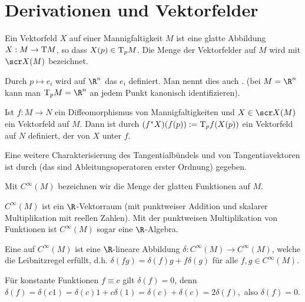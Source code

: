 

\section{Derivationen und Vektorfelder}


\begin{df} \label{3.7}
    Ein Vektorfeld $X$ auf einer Mannigfaltigkeit $M$ ist eine glatte Abbildung $X: M \to \mathrm{T} M$, so dass $X(p) \in \mathrm{T}_p M$.
    Die Menge der Vektorfelder auf $M$ wird mit $\scr X(M)$ bezeichnet.
\end{df}

\begin{ex}
    Durch $p \mapsto e_i$ wird auf $\R^n$ das  $e_i$ definiert.
    Man nennt dies auch .
    (bei $M = \R^n$ kann man $\T_p M = \R^n$ an jedem Punkt kanonisch identifizieren).
\end{ex}

\begin{df} \label{3.8}
    Ist $f: M \to N$ ein Diffeomorphismus von Mannigfaltigkeiten und $X \in \scr X(M)$ ein Vektorfeld auf $M$.
    Dann ist durch
    \begin{math}
        (f^* X)(f(p)) := \mathrm{T}_p f(X(p))
    \end{math}
    ein Vektorfeld auf $N$ definiert, der  von $X$ unter $f$.
\end{df}

Eine weitere Charakterisierung des Tangentialbündels und von Tangentiavektoren ist durch  (das sind Ableitungsoperatoren erster Ordnung) gegeben.

\begin{df} \label{3.9}
    Mit $C^\infty(M)$ bezeichnen wir die Menge der glatten Funktionen auf $M$.
    \begin{note}
        $C^\infty(M)$ ist ein $\R$-Vektorraum (mit punktweiser Addition und skalarer Multiplikation mit reellen Zahlen).
        Mit der punktweisen Multiplikation von Funktionen ist $C^\infty(M)$ sogar eine $\R$-Algebra.
    \end{note}
\end{df}

\begin{df} \label{3.10}
    Eine  auf $C^\infty(M)$ ist eine $\R$-lineare Abbildung $\delta: C^\infty(M) \to C^\infty(M)$, welche die Leibnitzregel erfüllt, d.h.
    \begin{math}
        \delta(fg) = \delta(f) g + f \delta(g)
    \end{math}
    für alle $f, g \in C^\infty(M)$.
    \begin{note}
        Für konstante Funktionen $f \equiv c$ gilt $\delta(f) = 0$, denn
        \begin{math}
            \delta(f) = \delta(c 1)
            = \delta(c)1 + c \delta(1)
            = \delta(c) + \delta(c)
            = 2 \delta(f),
        \end{math}
        also $\delta(f) = 0$.
    \end{note}
\end{df}

